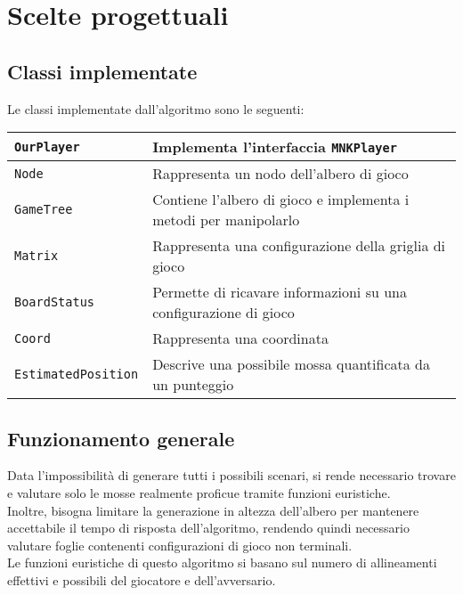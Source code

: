 \documentclass[11pt]{article}
\begin{document}
\section*{Scelte progettuali}
\subsection*{Classi implementate}
Le classi implementate dall'algoritmo sono le seguenti:
\begin{table}[H]	%
\centering			%
\def\arraystretch{1.5}
\begin{tabular}{|l|p{3in}|}	%
\hline	%
\texttt{OurPlayer} & Implementa l'interfaccia \texttt{MNKPlayer} \\ \hline
\texttt{Node} & Rappresenta un nodo dell'albero di gioco \\ \hline
\texttt{GameTree} & Contiene l'albero di gioco e implementa i metodi per manipolarlo \\ \hline
\texttt{Matrix} & Rappresenta una configurazione della griglia di gioco \\ \hline
\texttt{BoardStatus} & Permette di ricavare informazioni su una configurazione di gioco \\ \hline
\texttt{Coord} & Rappresenta una coordinata \\ \hline
\texttt{EstimatedPosition} & Descrive una possibile mossa quantificata da un punteggio \\ \hline
\end{tabular}
\end{table}

\subsection*{Funzionamento generale}
Data l'impossibilità di generare tutti i possibili scenari, si rende necessario trovare e valutare solo le mosse realmente proficue tramite funzioni euristiche.\\
Inoltre, bisogna limitare la generazione in altezza dell'albero per mantenere accettabile il tempo di risposta dell'algoritmo, rendendo quindi necessario valutare foglie contenenti configurazioni di gioco non terminali.\\
Le funzioni euristiche di questo algoritmo si basano sul numero di allineamenti effettivi e possibili del giocatore e dell'avversario.
\end{document}
